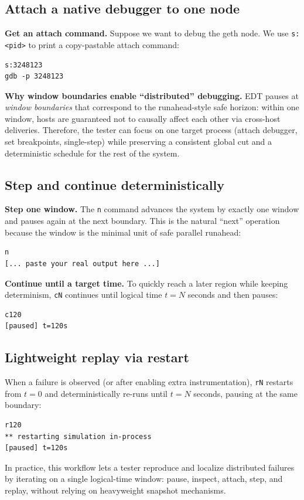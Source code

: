 \subsection{Attach a native debugger to one node}
\noindent\textbf{Get an attach command.}
Suppose we want to debug the geth node. We use \texttt{s:<pid>} to print a
copy-pastable attach command:

\begin{verbatim}
s:3248123
gdb -p 3248123
\end{verbatim}

\noindent\textbf{Why window boundaries enable ``distributed'' debugging.}
EDT pauses at \emph{window boundaries} that correspond to the runahead-style safe
horizon: within one window, hosts are guaranteed not to causally affect each
other via cross-host deliveries. Therefore, the tester can focus on one target
process (attach debugger, set breakpoints, single-step) while preserving a
consistent global cut and a deterministic schedule for the rest of the system.

\subsection{Step and continue deterministically}
\noindent\textbf{Step one window.}
The \texttt{n} command advances the system by exactly one window and pauses again
at the next boundary. This is the natural ``next'' operation because the window
is the minimal unit of safe parallel runahead:

\begin{verbatim}
n
[... paste your real output here ...]
\end{verbatim}

\noindent\textbf{Continue until a target time.}
To quickly reach a later region while keeping determinism, \texttt{cN} continues
until logical time \(t=N\) seconds and then pauses:

\begin{verbatim}
c120
[paused] t=120s
\end{verbatim}

\subsection{Lightweight replay via restart}
When a failure is observed (or after enabling extra instrumentation), \texttt{rN}
restarts from \(t=0\) and deterministically re-runs until \(t=N\) seconds,
pausing at the same boundary:

\begin{verbatim}
r120
** restarting simulation in-process
[paused] t=120s
\end{verbatim}

In practice, this workflow lets a tester reproduce and localize distributed
failures by iterating on a single logical-time window: pause, inspect, attach,
step, and replay, without relying on heavyweight snapshot mechanisms.
